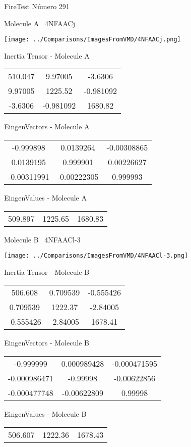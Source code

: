 \vtab[-3cm]
\begin{center}
{\large FireTest \tab Número 291}
\end{center}
\begin{multicols}{2}
\begin{center}

Molecule A \
4NFAACj

\texttt{[image: ../Comparisons/ImagesFromVMD/4NFAACj.png]}

Inertia Tensor - Molecule A \\
\begin{tabular}{|c c c|}
510.047	 & 	9.97005	 & 	-3.6306	 \\
9.97005	 & 	1225.52	 & 	-0.981092	 \\
-3.6306	 & 	-0.981092	 & 	1680.82
\end{tabular}

\vtab
 EingenVectors - Molecule A     \\
\begin{tabular}{|c c c|}
-0.999898	 & 	0.0139264	 & 	-0.00308865	 \\
0.0139195	 & 	0.999901	 & 	0.00226627	 \\
-0.00311991	 & 	-0.00222305	 & 	0.999993
\end{tabular}

\vtab
 EingenValues - Molecule A     \\
\begin{tabular}{|c c c|}
509.897	 & 	1225.65	 & 	1680.83	 \\
\end{tabular}
\columnbreak

Molecule B \
4NFAACl-3

\texttt{[image: ../Comparisons/ImagesFromVMD/4NFAACl-3.png]}

Inertia Tensor - Molecule B \\
\begin{tabular}{|c c c|}
506.608	 & 	0.709539	 & 	-0.555426	 \\
0.709539	 & 	1222.37	 & 	-2.84005	 \\
-0.555426	 & 	-2.84005	 & 	1678.41
\end{tabular}

\vtab
 EingenVectors - Molecule B     \\
\begin{tabular}{|c c c|}
-0.999999	 & 	0.000989428	 & 	-0.000471595	 \\
-0.000986471	 & 	-0.99998	 & 	-0.00622856	 \\
-0.000477748	 & 	-0.00622809	 & 	0.99998
\end{tabular}

\vtab
 EingenValues - Molecule B     \\
\begin{tabular}{|c c c|}
506.607	 & 	1222.36	 & 	1678.43	 \\
\end{tabular}

\end{center}
\end{multicols}


